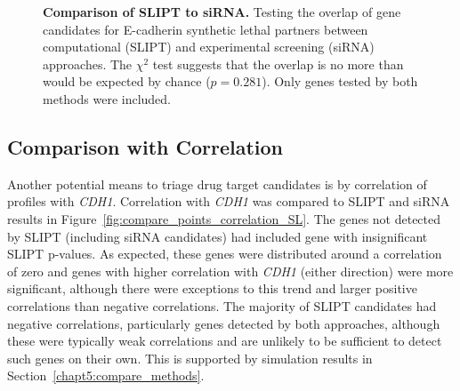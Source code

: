 \begin{figure}[!ht]
  \centering
    \caption[Comparison of SLIPT to \gls{siRNA}]{\small \textbf{Comparison of \gls{SLIPT} to \gls{siRNA}.} Testing the overlap of gene candidates for \gls{E-cadherin} \gls{synthetic lethal} partners between computational (\gls{SLIPT}) and experimental screening (\gls{siRNA}) approaches. The $\chi^2$ test suggests that the overlap is no more than would be expected by chance ($p = 0.281$).  Only genes tested by both methods were included. %
}
\label{fig:Venn_allgenes}
\end{figure}


\FloatBarrier

\subsection{Comparison with Correlation} \label{chapt3:compare_correlation} 

Another potential means to triage drug target candidates is by correlation of  profiles with \textit{CDH1}. Correlation with \textit{CDH1} was compared to \gls{SLIPT} and \gls{siRNA} results in Figure~\ref{fig:compare_points_correlation_SL}. The genes not detected by \gls{SLIPT} (including \gls{siRNA} candidates) had included gene with insignificant \gls{SLIPT} p-values. As expected, these genes were distributed around a correlation of zero and genes with higher correlation with \textit{CDH1} (either direction) were more significant, although there were exceptions to this trend and larger positive correlations than negative correlations. The majority of \gls{SLIPT} candidates had negative correlations, particularly genes detected by both approaches, although these were typically weak correlations and are unlikely to be sufficient to detect such genes on their own. This is supported by simulation results in Section~\ref{chapt5:compare_methods}.

